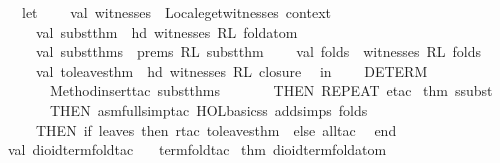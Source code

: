\begin{isabellebody}
\ \ let\isanewline
\ \ \ \ val\ witnesses\ {}\ Locale{}get{}witnesses\ context\isanewline
\ \ \ \ val\ subst{}thm\ {}\ hd\ {}witnesses\ RL\ {}fold{}atom{}{}\isanewline
\ \ \ \ val\ subst{}thms\ {}\ prems\ RL\ {}subst{}thm{}\isanewline
\ \ \ \ val\ folds\ {}\ witnesses\ RL\ folds\isanewline
\ \ \ \ val\ to{}leaves{}thm\ {}\ hd\ {}witnesses\ RL\ {}closure{}{}\isanewline
\ \ in\isanewline
\ \ \ \ DETERM\isanewline
\ \ \ \ \ \ {}Method{}insert{}tac\ subst{}thms\ {}\isanewline
\ \ \ \ \ \ THEN\ REPEAT\ {}etac\ %
\isaantiq
thm\ ssubst{}%
\endisaantiq
\ {}{}\isanewline
\ \ \ \ \ \ THEN\ asm{}full{}simp{}tac\ {}HOL{}basic{}ss\ addsimps\ folds{}\ {}{}\isanewline
\ \ \ \ THEN\ {}if\ leaves\ then\ rtac\ to{}leaves{}thm\ {}\ else\ all{}tac{}\isanewline
\ \ end{}\isanewline
\isanewline
val\ dioid{}term{}fold{}tac\ {}\isanewline
\ \ term{}fold{}tac\ %
\isaantiq
thm\ dioid{}term{}fold{}atom{}%

\end{isabellebody}

